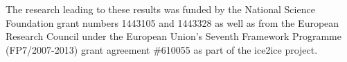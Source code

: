 \documentclass[draft, jgrga]{AGUTeX}
\begin{document}
\begin{article}






%
%
%


\begin{acknowledgments}
The research leading to these results was funded by the National Science Foundation grant numbers 1443105 and 1443328 as well as from the European Research Council under the European Union's Seventh Framework Programme (FP7/2007-2013) grant agreement \#610055 as part of the ice2ice project.
\end{acknowledgments}


\end{article}
\end{document}
